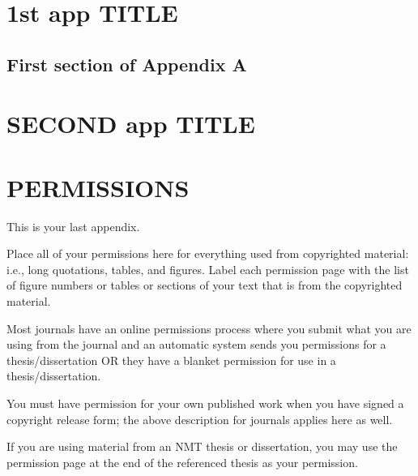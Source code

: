 \documentclass[12pt]{report}
\begin{document}
%



   \appendix
   \chapter{1st app TITLE}
   \section{First section of Appendix A}
   \chapter{SECOND app TITLE}
\chapter{PERMISSIONS}
   This is your last appendix. 
   
   Place all of your permissions here for everything used from copyrighted material: i.e., long quotations, tables, and figures. Label each permission page with the list of figure numbers or tables or sections of your text that is from the copyrighted material.
   
   Most journals have an online permissions process where you submit what you are using from the journal and an automatic system sends you permissions for a thesis/dissertation OR they have a blanket permission for use in a thesis/dissertation. 
   
   You must have permission for your own published work when you have signed a copyright release form; the above description for journals applies here as well. 
   
   If you are using material from an NMT thesis or dissertation, you may use the permission page at the end of the referenced thesis as your permission. 


% 
\copyrightpage
\end{document}
